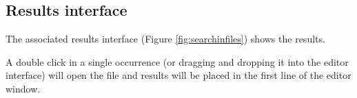 \subsection{Results interface}

The associated results interface
(Figure \ref{fig:searchinfiles})
shows the results.

A double click in a single occurrence (or dragging and dropping it into the
editor interface) will open the file and results will be placed in the first
line of the editor window.
